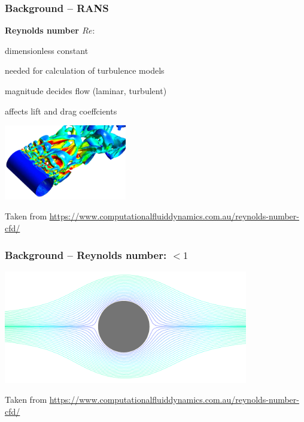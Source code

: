 \begin{frame}
    \frametitle{Background -- RANS}
	\vspace*{8mm}
\begin{multicols}{2}
	\textbf{Reynolds number $Re$}:

\begin{PraesentationAufzaehlung}
		\item dimensionless constant
		\item needed for calculation of turbulence models
		\item magnitude decides flow (laminar, turbulent)
		\item  affects lift and drag coeffcients
\end{PraesentationAufzaehlung}

\vfill\columnbreak
\includegraphics[width=0.4\textwidth, height=.55\textheight]{./Ressourcen/Praesentation/Bilder/Re/re_3d.png}
\end{multicols}
\vspace*{-6mm}
Taken from \url{https://www.computationalfluiddynamics.com.au/reynolds-number-cfd/}

\end{frame}
\clearpage

\begin{frame}
    \frametitle{Background -- Reynolds number: $<1$}
	\vspace*{8mm}
\includegraphics[width=0.8\textwidth, height=.55\textheight]{./Ressourcen/Praesentation/Bilder/Re/re_1.png}

Taken from \url{https://www.computationalfluiddynamics.com.au/reynolds-number-cfd/}
\end{frame}
\clearpage

